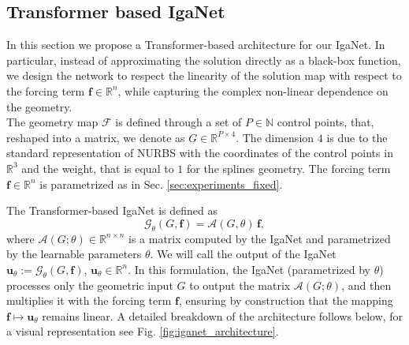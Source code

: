 \documentclass{article}
\newcommand{\R}{\mathbb{R}}
\newcommand{\N}{\mathbb{N}}
\theoremstyle{plain}
\numberwithin{equation}{section}
\begin{document}
\subsection{Transformer based IgaNet}\label{sec:transformer_iganet}
In this section we propose a Transformer-based architecture for our IgaNet. In particular, instead of approximating the solution directly as a black-box function, we design the network to respect the linearity of the solution map with respect to the forcing term $\mathbf{f}\in \R^n$, while capturing the complex non-linear dependence on the geometry.
\\
The geometry map $\mathcal{F}$  is defined through a set of $P\in \N$  control points, that, reshaped into a matrix, we denote as $G\in \mathbb{R}^{P \times 4}$.
The dimension $4$ is due to the standard representation of NURBS with the coordinates of the control points in $\R^3$ and the weight, that is equal to $1$ for the splines geometry. %
The forcing term $\mathbf{f}\in \R^n$ is parametrized as in Sec. \ref{sec:experiments_fixed}.

The Transformer-based IgaNet is defined as
\begin{equation*}
    \mathcal{G}_{\theta}(G, \mathbf{f}) = \mathcal{A}(G, \theta) \, \mathbf{f},
\end{equation*}
where $\mathcal{A}(G; \theta)\in \R^{n\times n}$ is a matrix computed by the IgaNet and parametrized by the learnable parameters $\theta$. We will call the output of the IgaNet $\mathbf{u}_{\theta} := \mathcal{G}_{\theta}(G, \mathbf{f})$, $\mathbf{u}_{\theta}\in \R^n$.
In this formulation, the IgaNet (parametrized by $\theta$) processes only the geometric input $G$ to output the matrix $\mathcal{A}(G; \theta)$, and then multiplies it with the forcing term $\mathbf{f}$, ensuring by construction that the mapping $\mathbf{f} \mapsto \mathbf{u}_\theta$ remains linear. A detailed breakdown of the architecture follows below, for a visual representation see Fig. \ref{fig:iganet_architecture}.
\end{document}
